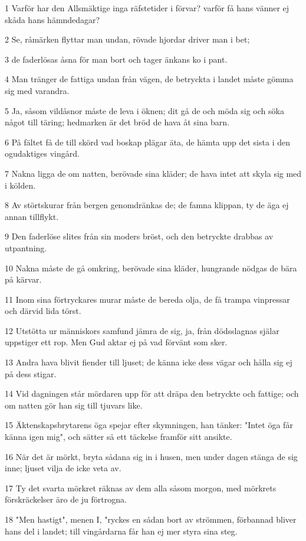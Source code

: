 \par 1 Varför har den Allsmäktige inga räfstetider i förvar? varför få hans vänner ej skåda hans hämndedagar?
\par 2 Se, råmärken flyttar man undan, rövade hjordar driver man i bet;
\par 3 de faderlösas åsna för man bort och tager änkans ko i pant.
\par 4 Man tränger de fattiga undan från vägen, de betryckta i landet måste gömma sig med varandra.
\par 5 Ja, såsom vildåsnor måste de leva i öknen; dit gå de och möda sig och söka något till täring; hedmarken är det bröd de hava åt sina barn.
\par 6 På fältet få de till skörd vad boskap plägar äta, de hämta upp det sista i den ogudaktiges vingård.
\par 7 Nakna ligga de om natten, berövade sina kläder; de hava intet att skyla sig med i kölden.
\par 8 Av störtskurar från bergen genomdränkas de; de famna klippan, ty de äga ej annan tillflykt.
\par 9 Den faderlöse slites från sin moders bröst, och den betryckte drabbas av utpantning.
\par 10 Nakna måste de gå omkring, berövade sina kläder, hungrande nödgas de bära på kärvar.
\par 11 Inom sina förtryckares murar måste de bereda olja, de få trampa vinpressar och därvid lida törst.
\par 12 Utstötta ur människors samfund jämra de sig, ja, från dödsslagnas själar uppstiger ett rop. Men Gud aktar ej på vad förvänt som sker.
\par 13 Andra hava blivit fiender till ljuset; de känna icke dess vägar och hålla sig ej på dess stigar.
\par 14 Vid dagningen står mördaren upp för att dräpa den betryckte och fattige; och om natten gör han sig till tjuvars like.
\par 15 Äktenskapsbrytarens öga spejar efter skymningen, han tänker: "Intet öga får känna igen mig", och sätter så ett täckelse framför sitt ansikte.
\par 16 När det är mörkt, bryta sådana sig in i husen, men under dagen stänga de sig inne; ljuset vilja de icke veta av.
\par 17 Ty det svarta mörkret räknas av dem alla såsom morgon, med mörkrets förskräckelser äro de ju förtrogna.
\par 18 "Men hastigt", menen I, "ryckes en sådan bort av strömmen, förbannad bliver hans del i landet; till vingårdarna får han ej mer styra sina steg.
